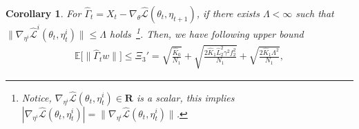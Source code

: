 \documentclass[twoside]{article} %
\theoremstyle{plain}
\newtheorem{corollary}[theorem]{Corollary}
\theoremstyle{definition}
\theoremstyle{remark}
\newcommand{\HGamma}{\hat{\Gamma}}
\newcommand{\hL}{\hat{L}}
\newcommand{\fhL}{\hat{\mathcal{L}}}
\begin{document}
\begin{corollary}
    For $\HGamma_{t}={X}_t-\nabla_{\theta}\fhL(\theta_t, \eta_{t+1})$, if there exists $\Lambda<\infty$ such that
    $\|\nabla_{\eta^i}\fhL^i(\theta_t, \eta^i_{t})\|\leq \Lambda$ holds~\footnote{Notice, $\nabla_{\eta^i}\fhL(\theta_t,\eta_t^i)\in \mathbf{R}$ is a scalar, this implies $|\nabla_{\eta^i}\fhL(\theta_t, \eta_{t}^i)|=\|\nabla_{\eta^i}\fhL(\theta_t, \eta_{t}^i)\|$.}. Then, we have following upper bound
    \begin{align}
        \mathbb{E}\big[\|\HGamma_{t}w\|\big]\leq \Xi_3'=\sqrt{\frac{\hat{K}_0}{N_1}}+\sqrt{\frac{2\hat{K}_1\hL_2^2\gamma^2f_2^2}{N_1}}+\sqrt{\frac{2\hat{K}_1\Lambda^2}{N_1}},
        \label{eq: estimation error bound thm2}
    \end{align}
\end{corollary}
\end{document}
